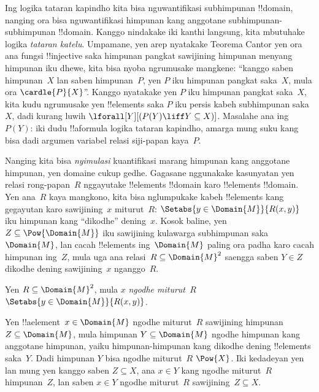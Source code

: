 \documentclass[../../../include/open-logic-section]{subfiles}
\begin{document}


\begin{explain}
Ing logika tataran kapindho kita bisa nguwantifikasi
subhimpunan !!{domain}, nanging ora bisa nguwantifikasi
himpunan kang anggotane subhimpunan-subhimpunan !!{domain}.
Kanggo nindakake iki kanthi langsung, kita mbutuhake
logika \emph{tataran katelu}. Umpamane, yen arep nyatakake
Teorema Cantor yen ora ana fungsi !!{injective} saka
himpunan pangkat sawijining himpunan menyang himpunan iku
dhewe, kita bisa nyoba ngrumusake mangkene:
``kanggo saben himpunan~$X$ lan saben himpunan~$P$,
yen $P$ iku himpunan pangkat saka~$X$, mula
ora $\cardle{P}{X}$''. Kanggo nyatakake yen $P$
iku himpunan pangkat saka~$X$, kita kudu ngrumusake
yen !!{element}s saka $P$ iku persis kabeh subhimpunan
saka~$X$, dadi kurang luwih
$\lforall[Y][(P(Y) \liff Y \subseteq X)]$.
Masalahe ana ing $P(Y)$: iki dudu !!a{formula}
logika tataran kapindho, amarga mung suku kang bisa dadi
argumen variabel relasi siji-papan kaya~$P$.

Nanging kita bisa \emph{nyimulasi} kuantifikasi
marang himpunan kang anggotane himpunan, yen
domaine cukup gedhe. Gagasane nggunakake kasunyatan
yen relasi rong-papan~$R$ nggayutake !!{element}s
!!{domain} karo !!{element}s !!{domain}.
Yen ana~$R$ kaya mangkono, kita bisa nglumpukake
kabeh !!{element}s kang gegayutan karo
sawijining~$x$ miturut~$R$: $\Setabs{y \in
  \Domain{M}}{R(x,y)}$ iku himpunan kang
``dikodhe'' dening~$x$. Kosok baline, yen
$Z \subseteq \Pow{\Domain{M}}$ iku sawijining
kulawarga subhimpunan saka~$\Domain{M}$,
lan cacah !!{element}s ing~$\Domain{M}$
paling ora padha karo cacah himpunan ing~$Z$,
mula uga ana relasi~$R \subseteq \Domain{M}^2$
saengga saben $Y \in Z$ dikodhe dening
sawijining~$x$ nganggo~$R$.
\end{explain}

\begin{defn}
Yen $R \subseteq \Domain{M}^2$, mula
$x$ \emph{ngodhe miturut~$R$}
$\Setabs{y \in \Domain{M}}{R(x, y)}$.
\end{defn}

Yen !!a{element}~$x \in \Domain{M}$ ngodhe
miturut~$R$ sawijining himpunan
$Z \subseteq \Domain{M}$, mula himpunan
$Y \subseteq \Domain{M}$ ngodhe himpunan kang
anggotane himpunan, yaiku himpunan-himpunan kang
dikodhe dening !!{element}s saka~$Y$. Dadi
himpunan $Y$ bisa ngodhe miturut~$R$
$\Pow{X}$. Iki kedadeyan yen lan mung yen kanggo
saben $Z \subseteq X$, ana $x \in Y$ kang
ngodhe miturut~$R$ himpunan~$Z$, lan saben
$x \in Y$ ngodhe miturut~$R$ sawijining~$Z \subseteq X$.
\end{document}
